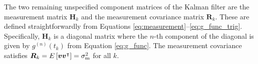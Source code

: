 \documentclass[fleqn,usenatbib,useAMS]{mnras}
\begin{document}
The two remaining unspecified component matrices of the Kalman filter are the measurement matrix $\boldsymbol{H}_k$ and the measurement covariance matrix $\boldsymbol{R}_k$. These are defined straightforwardly from Equations \eqref{eq:measurement}--\eqref{eq:g_func_trig}. Specifically, 
$\boldsymbol{H}_k$ is a diagonal matrix where the $n$-th component of the diagonal is given by $g^{(n)}(t_k)$ from Equation \eqref{eq:g_func}. The measurement covariance satisfies $\boldsymbol{R}_k = E \left[ \boldsymbol{v} \boldsymbol{v}^\intercal \right] = \sigma^2_{\rm m}$ for all $k$.










%
%
\end{document}
